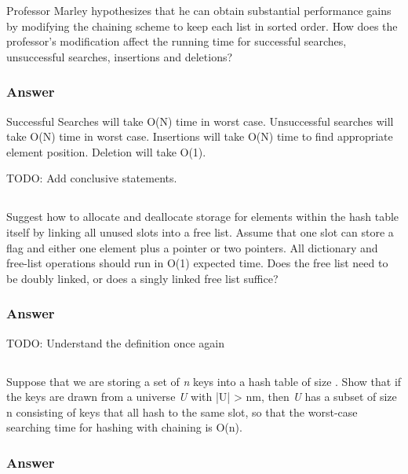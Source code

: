     Professor Marley hypothesizes that he can obtain substantial performance
    gains by modifying the chaining scheme to keep each list in sorted order.
    How does the professor's modification affect the running time for
    successful searches, unsuccessful searches, insertions and deletions?

    \subsubsection{Answer}
      Successful Searches will take O(N) time in worst case. Unsuccessful
      searches will take O(N) time in worst case. Insertions will take O(N)
      time to find appropriate element position. Deletion will take O(1).

      TODO: Add conclusive statements.

   \subsection{}

   Suggest how to allocate and deallocate storage for elements within the hash
   table itself by linking all unused slots into a free list. Assume that one
   slot can store a flag and either one element plus a pointer or two pointers.
   All dictionary and free-list operations should run in O(1) expected time.
   Does the free list need to be doubly linked, or does a singly linked free
   list suffice?

   \subsubsection{Answer}

   TODO: Understand the definition once again

   \subsection{}

   Suppose that we are storing a set of \textit{n} keys into a hash table of
   size . Show that if the keys are drawn from a universe \textit{U}
   with |U| > nm, then \textit{U} has a subset of size n consisting of keys
   that all hash to the same slot, so that the worst-case searching time for
   hashing with chaining is O(n).

   \subsubsection{Answer}

